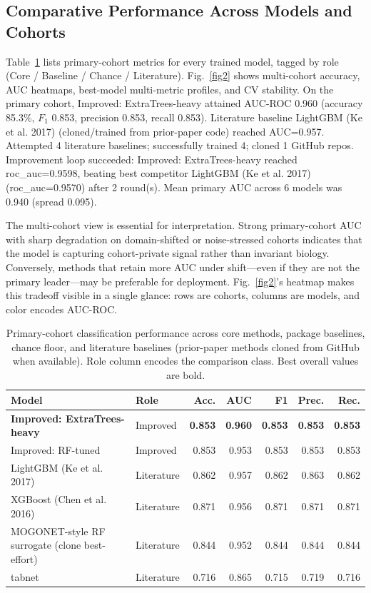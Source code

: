 \documentclass[10pt,journal]{IEEEtran}
\begin{document}
\subsection{Comparative Performance Across Models and Cohorts}
Table~\ref{tab:results} lists primary-cohort metrics for every trained model, tagged by role
(Core / Baseline / Chance / Literature). Fig.~\ref{fig2} shows multi-cohort accuracy, AUC
heatmaps, best-model multi-metric profiles, and CV stability. On the primary cohort,
Improved: ExtraTrees-heavy attained AUC-ROC 0.960 (accuracy 85.3\%, $F_1$ 0.853,
precision 0.853, recall 0.853).
Literature baseline LightGBM (Ke et al. 2017) (cloned/trained from prior-paper code) reached AUC=0.957. Attempted 4 literature baselines; successfully trained 4; cloned 1 GitHub repos. Improvement loop succeeded: Improved: ExtraTrees-heavy reached roc\_auc=0.9598, beating best competitor LightGBM (Ke et al. 2017) (roc\_auc=0.9570) after 2 round(s). Mean primary AUC across 6 models was 0.940 (spread 0.095).

The multi-cohort view is essential for interpretation. Strong primary-cohort AUC with sharp
degradation on domain-shifted or noise-stressed cohorts indicates that the model is capturing
cohort-private signal rather than invariant biology. Conversely, methods that retain more AUC
under shift---even if they are not the primary leader---may be preferable for deployment.
Fig.~\ref{fig2}'s heatmap makes this tradeoff visible in a single glance: rows are cohorts,
columns are models, and color encodes AUC-ROC.

\begin{table}[!t]
\caption{Primary-cohort classification performance across core methods, package baselines, chance floor, and literature baselines (prior-paper methods cloned from GitHub when available). Role column encodes the comparison class. Best overall values are bold.}
\label{tab:results}
\centering\footnotesize
\begin{tabular}{llrrrrr}
\toprule
Model & Role & Acc. & AUC & F1 & Prec. & Rec. \\
\midrule
        \textbf{Improved: ExtraTrees-heavy} & Improved & \textbf{0.853} & \textbf{0.960} & \textbf{0.853} & \textbf{0.853} & \textbf{0.853} \\
        Improved: RF-tuned & Improved & 0.853 & 0.953 & 0.853 & 0.853 & 0.853 \\
        LightGBM (Ke et al. 2017) & Literature & 0.862 & 0.957 & 0.862 & 0.863 & 0.862 \\
        XGBoost (Chen et al. 2016) & Literature & 0.871 & 0.956 & 0.871 & 0.871 & 0.871 \\
        MOGONET-style RF surrogate (clone best-effort) & Literature & 0.844 & 0.952 & 0.844 & 0.844 & 0.844 \\
        tabnet & Literature & 0.716 & 0.865 & 0.715 & 0.719 & 0.716 \\
\bottomrule
\end{tabular}
\end{table}
\end{document}
